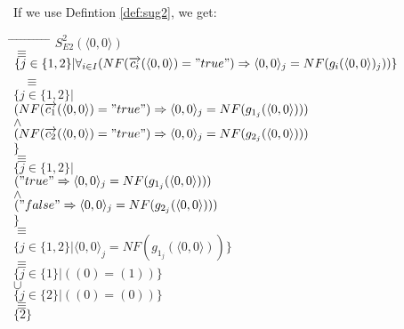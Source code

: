 \index{}\documentclass[a4paper,10pt]{article}
\theoremstyle{plain}
\theoremstyle{definition}
\newcommand{\ovr}{\overrightarrow}
\begin{document}
\begin{defn}
\begin{example} [Let $E2$ be]
\begin{verbatim}
\end{verbatim}
\end{example}
If we use Defintion \ref{def:sug2}, we get:
\begin{tabbing}
\hspace*{5.mm} \= \hspace*{5.mm} \= \hspace*{5.mm} \= \hspace*{5.mm} \= \hspace*{5.mm} \= \hspace*{5.mm}  \= \hspace*{5.mm}  \= \hspace*{5.mm}  \= \hspace*{5.mm} \= \hspace*{5.mm} \= \hspace*{5.mm}\kill
\> \> $S_{E2}^2(\langle 0, 0 \rangle)$\\
\> $\equiv$\\
\> \> $\lbrace j \in \lbrace 1, 2 \rbrace \vert \forall_{i\in I} (NF(\ovr{c_i}( \langle  0,  0\rangle ) = "true") \Rightarrow  \langle  0,  0\rangle_j = NF(g_i( \langle  0,  0\rangle)_j))\rbrace $\\\
\> $\equiv$ \\
\> \>$\lbrace j \in \lbrace 1, 2 \rbrace \vert $ \\
\> \> \> $(NF(\ovr{c_1}( \langle  0,  0\rangle ) = "true") \Rightarrow  \langle  0,  0\rangle_j = NF(g_{1_j}( \langle  0,  0\rangle))) $\\
\> \> \> $\wedge$ \\
\> \> \> $ (NF(\ovr{c_2}( \langle  0,  0\rangle ) = "true") \Rightarrow  \langle  0,  0\rangle_j = NF(g_{2_j}( \langle  0,  0\rangle))) $ \\
\> \>$
\rbrace $\\
\> $\equiv$ \\
\> \> $\lbrace j \in \lbrace 1, 2 \rbrace \vert $\\
\> \> \> $("true" \Rightarrow  \langle  0,  0\rangle_j = NF(g_{1_j}( \langle  0,  0\rangle)))$ \\
\> \> \> $\wedge$ \\
\> \> \> $("false" \Rightarrow  \langle  0,  0\rangle_j = NF(g_{2_j}( \langle  0,  0\rangle)))$ \\
\> \> $\rbrace $\\
\> $\equiv$ \\
\> \> $\lbrace j \in \lbrace 1, 2 \rbrace \vert 
\langle  0,  0\rangle_j = NF(g_{1_j}( \langle  0,  0\rangle))
\rbrace $\\
\> $\equiv$\\
\> \> $\lbrace j \in \lbrace 1 \rbrace \vert (( 0)  = ( 1)) \rbrace $\\
\> \> $\cup$ \\
\> \> $\lbrace j \in \lbrace 2 \rbrace \vert (( 0)  = ( 0)) \rbrace $\\
\> $\equiv $ \\
\> \> $\lbrace 2 \rbrace$ \\
\end{tabbing}


\end{defn}
\end{document}
